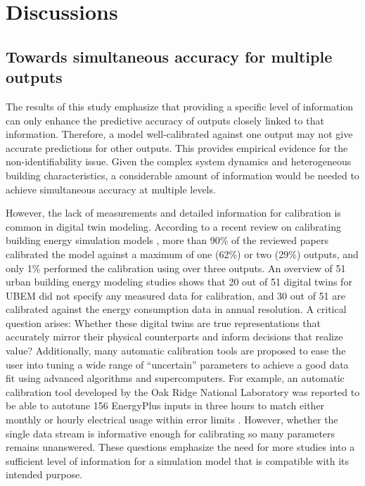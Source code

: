 \documentclass[3p,times,12pt]{elsarticle}
\begin{document}
\begin{sloppypar}
\section{Discussions}
\label{S:4}

\subsection{Towards simultaneous accuracy for multiple outputs}
\label{S:4.1}
The results of this study emphasize that providing a specific level of information can only enhance the predictive accuracy of outputs closely linked to that information. Therefore, a model well-calibrated against one output may not give accurate predictions for other outputs. This provides empirical evidence for the non-identifiability issue. Given the complex system dynamics and heterogeneous building characteristics, a considerable amount of information would be needed to achieve simultaneous accuracy at multiple levels.

However, the lack of measurements and detailed information for calibration is common in digital twin modeling. According to a recent review on calibrating building energy simulation models \cite{chong2021calibrating}, more than 90\% of the reviewed papers calibrated the model against a maximum of one (62\%) or two (29\%) outputs, and only 1\% performed the calibration using over three outputs. An overview of 51 urban building energy modeling studies \cite{oraiopoulos2022accuracy} shows that 20 out of 51 digital twins for UBEM did not specify any measured data for calibration, and 30 out of 51 are calibrated against the energy consumption data in annual resolution. A critical question arises: Whether these digital twins are true representations that accurately mirror their physical counterparts and inform decisions that realize value? Additionally, many automatic calibration tools are proposed to ease the user into tuning a wide range of “uncertain” parameters to achieve a good data fit using advanced algorithms and supercomputers. For example, an automatic calibration tool developed by the Oak Ridge National Laboratory was reported to be able to autotune 156 EnergyPlus inputs in three hours to match either monthly or hourly electrical usage within error limits \cite{garrett2015scalable}. However, whether the single data stream is informative enough for calibrating so many parameters remains unanswered. These questions emphasize the need for more studies into a sufficient level of information for a simulation model that is compatible with its intended purpose.



\end{sloppypar}
\end{document}
